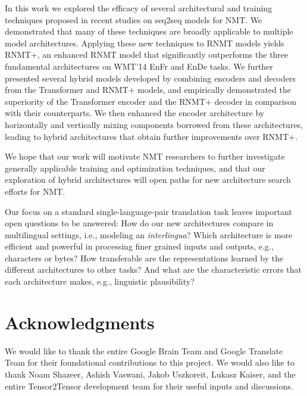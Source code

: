 \documentclass[11pt,a4paper]{article}
\newif\ifblindreview \blindreviewfalse
\begin{document}
In this work we explored the efficacy of several architectural and training
techniques proposed in recent studies on seq2seq
models for NMT. We demonstrated that many of these techniques
are broadly applicable to multiple model architectures.
Applying these new techniques to RNMT models yields RNMT+, an enhanced RNMT
model that
significantly outperforms the three fundamental architectures
on WMT'14 EnFr and EnDe tasks.
We further presented several hybrid models developed by combining
encoders and decoders from the Transformer and RNMT+ models, and empirically
demonstrated the superiority of the Transformer encoder and the RNMT+
decoder in comparison with their counterparts. We then enhanced the encoder
architecture by horizontally and vertically mixing components borrowed from
these architectures, leading to hybrid architectures that obtain further improvements
over RNMT+.

We hope that our work will motivate NMT researchers to further
investigate
generally applicable training and optimization techniques,
and that our exploration of hybrid architectures will open
paths for new architecture search efforts for NMT.

Our focus on a standard single-language-pair translation task leaves
important open questions to be answered:
How do our new architectures compare in multilingual settings, i.e., modeling
an \textit{interlingua}? Which architecture is more efficient and
powerful in processing finer grained inputs and outputs, e.g., characters or
bytes? How transferable are the representations learned by the different
architectures to other tasks? And what are the characteristic errors that
each architecture makes, e.g., linguistic plausibility?













\ifblindreview
\else
\section*{Acknowledgments}

We would like to thank the entire Google Brain Team and Google Translate Team for their foundational contributions to this project. We would also like to thank Noam Shazeer, Ashish Vaswani, Jakob Uszkoreit, Lukasz Kaiser, and the entire Tensor2Tensor development team for their useful inputs and discussions.
\fi
\end{document}
